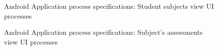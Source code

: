 \begin{figure}[H]
\centering	
{}
\caption{Android Application process specifications: Student subjects view UI processes}
\end{figure}

\begin{figure}[H]
\centering	
{}
\caption{Android Application process specifications: Subject's assessments view UI processes}
\end{figure}

